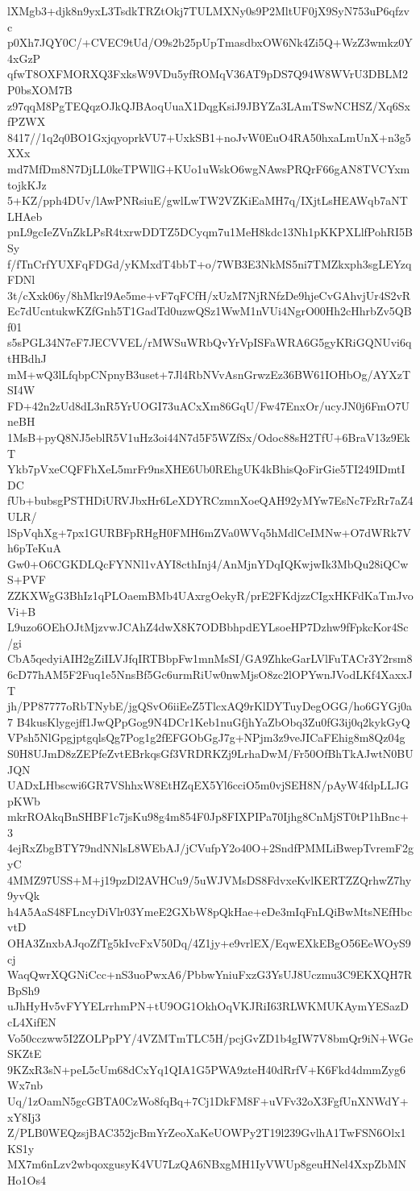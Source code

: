 lXMgb3+djk8n9yxL3TsdkTRZtOkj7TULMXNy0s9P2MltUF0jX9SyN753uP6qfzvc
p0Xh7JQY0C/+CVEC9tUd/O9s2b25pUpTmasdbxOW6Nk4Zi5Q+WzZ3wmkz0Y4xGzP
qfwT8OXFMORXQ3FxksW9VDu5yfROMqV36AT9pDS7Q94W8WVrU3DBLM2P0bsXOM7B
z97qqM8PgTEQqzOJkQJBAoqUuaX1DqgKsiJ9JBYZa3LAmTSwNCHSZ/Xq6SxfPZWX
8417//1q2q0BO1GxjqyoprkVU7+UxkSB1+noJvW0EuO4RA50hxaLmUnX+n3g5XXx
md7MfDm8N7DjLL0keTPWllG+KUo1uWskO6wgNAwsPRQrF66gAN8TVCYxmtojkKJz
5+KZ/pph4DUv/lAwPNRsiuE/gwlLwTW2VZKiEaMH7q/IXjtLsHEAWqb7aNTLHAeb
pnL9gcIeZVnZkLPsR4txrwDDTZ5DCyqm7u1MeH8kdc13Nh1pKKPXLlfPohRI5BSy
f/fTnCrfYUXFqFDGd/yKMxdT4bbT+o/7WB3E3NkMS5ni7TMZkxph3sgLEYzqFDNl
3t/cXxk06y/8hMkrl9Ae5me+vF7qFCfH/xUzM7NjRNfzDe9hjeCvGAhvjUr4S2vR
Ec7dUcntukwKZfGnh5T1GadTd0uzwQSz1WwM1nVUi4NgrO00Hh2cHhrbZv5QBf01
s5sPGL34N7eF7JECVVEL/rMWSuWRbQvYrVpISFaWRA6G5gyKRiGQNUvi6qtHBdhJ
mM+wQ3lLfqbpCNpnyB3uset+7Jl4RbNVvAsnGrwzEz36BW61IOHbOg/AYXzTSI4W
FD+42n2zUd8dL3nR5YrUOGI73uACxXm86GqU/Fw47EnxOr/ucyJN0j6FmO7UneBH
1MsB+pyQ8NJ5eblR5V1uHz3oi44N7d5F5WZfSx/Odoc88sH2TfU+6BraV13z9EkT
Ykb7pVxeCQFFhXeL5mrFr9nsXHE6Ub0REhgUK4kBhisQoFirGie5TI249IDmtIDC
fUb+bubsgPSTHDiURVJbxHr6LeXDYRCzmnXoeQAH92yMYw7EsNc7FzRr7aZ4ULR/
lSpVqhXg+7px1GURBFpRHgH0FMH6mZVa0WVq5hMdlCeIMNw+O7dWRk7Vh6pTeKuA
Gw0+O6CGKDLQcFYNNl1vAYI8cthInj4/AnMjnYDqIQKwjwIk3MbQu28iQCwS+PVF
ZZKXWgG3BhIz1qPLOaemBMb4UAxrgOekyR/prE2FKdjzzCIgxHKFdKaTmJvoVi+B
L9uzo6OEhOJtMjzvwJCAhZ4dwX8K7ODBbhpdEYLsoeHP7Dzhw9fFpkcKor4Sc/gi
CbA5qedyiAIH2gZiILVJfqIRTBbpFw1mnMsSI/GA9ZhkeGarLVlFuTACr3Y2rsm8
6cD77hAM5F2Fuq1e5NnsBf5Gc6urmRiUw0nwMjsO8zc2lOPYwnJVodLKf4XaxxJT
jh/PP87777oRbTNybE/jgQSvO6iiEeZ5TlcxAQ9rKlDYTuyDegOGG/ho6GYGj0a7
B4kusKlygejff1JwQPpGog9N4DCr1Keb1nuGfjhYaZbObq3Zu0fG3ij0q2kykGyQ
VPsh5NlGpgjptgqlsQg7Pog1g2fEFGObGgJ7g+NPjm3z9veJICaFEhig8m8Qz04g
S0H8UJmD8zZEPfeZvtEBrkqsGf3VRDRKZj9LrhaDwM/Fr50OfBhTkAJwtN0BUJQN
UADxLHbscwi6GR7VShhxW8EtHZqEX5Yl6cciO5m0vjSEH8N/pAyW4fdpLLJGpKWb
mkrROAkqBnSHBF1c7jsKu98g4m854F0Jp8FIXPIPa70Ijhg8CnMjST0tP1hBnc+3
4ejRxZbgBTY79ndNNlsL8WEbAJ/jCVufpY2o40O+2SndfPMMLiBwepTvremF2gyC
4MMZ97USS+M+j19pzDl2AVHCu9/5uWJVMsDS8FdvxeKvlKERTZZQrhwZ7hy9yvQk
h4A5AaS48FLncyDiVlr03YmeE2GXbW8pQkHae+eDe3mIqFnLQiBwMtsNEfHbcvtD
OHA3ZnxbAJqoZfTg5kIvcFxV50Dq/4Z1jy+e9vrlEX/EqwEXkEBgO56EeWOyS9cj
WaqQwrXQGNiCcc+nS3uoPwxA6/PbbwYniuFxzG3YsUJ8Uczmu3C9EKXQH7RBpSh9
uJhHyHv5vFYYELrrhmPN+tU9OG1OkhOqVKJRiI63RLWKMUKAymYESazDcL4XifEN
Vo50cczww5I2ZOLPpPY/4VZMTmTLC5H/pcjGvZD1b4gIW7V8bmQr9iN+WGeSKZtE
9KZxR3sN+peL5cUm68dCxYq1QIA1G5PWA9zteH40dRrfV+K6Fkd4dmmZyg6Wx7nb
Uq/1zOamN5gcGBTA0CzWo8fqBq+7Cj1DkFM8F+uVFv32oX3FgfUnXNWdY+xY8Ij3
Z/PLB0WEQzsjBAC352jcBmYrZeoXaKeUOWPy2T19l239GvlhA1TwFSN6Olx1KS1y
MX7m6nLzv2wbqoxgusyK4VU7LzQA6NBxgMH1IyVWUp8geuHNel4XxpZbMNHo1Os4
